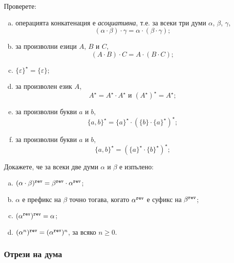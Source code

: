 

\begin{extra}
\begin{problem}
  Проверете:
  \begin{enumerate}[a)]
  \item 
    операцията конкатенация е {\em асоциативна}, т.е. за всеки три думи $\alpha$, $\beta$, $\gamma$,
    \[(\alpha\cdot\beta)\cdot\gamma = \alpha\cdot(\beta\cdot\gamma);\]
  \item
    за произволни езици $A$, $B$ и $C$, 
    \[(A\cdot B)\cdot C = A\cdot (B\cdot C);\]
  \item
    $\{\varepsilon\}^\star = \{\varepsilon\}$;
  \item
    за произволен език $A$,
    \[A^\star = A^\star\cdot A^\star\text{ и }(A^\star)^\star = A^\star;\]
  \item
    за произволни букви $a$ и $b$,
    \[\{a,b\}^\star = \{a\}^\star\cdot(\{b\}\cdot\{a\}^\star)^\star;\]
  \item
    за произволни букви $a$ и $b$,
    \[\{a,b\}^\star = (\{a\}^\star\cdot \{b\}^\star)^\star;\]
  \end{enumerate}
\end{problem}

\begin{problem}
  Докажете, че за всеки две думи $\alpha$ и $\beta$ е изпълено:
  \begin{enumerate}[a)]
  \item 
    $(\alpha\cdot\beta)^{\texttt{rev}} = \beta^{\texttt{rev}}\cdot\alpha^{\texttt{rev}}$;
  \item
    $\alpha$ е префикс на $\beta$ точно тогава, когато $\alpha^{\texttt{rev}}$ е суфикс на $\beta^{\texttt{rev}}$;
  \item
    $(\alpha^{\texttt{rev}})^{\texttt{rev}} = \alpha$;
  \item
    $(\alpha^n)^{\texttt{rev}} = (\alpha^{\texttt{rev}})^n$, за всяко $n \geq 0$.
  \end{enumerate}
\end{problem}
\end{extra}

\subsubsection*{Отрези на дума}\label{sect:intro:slices}

